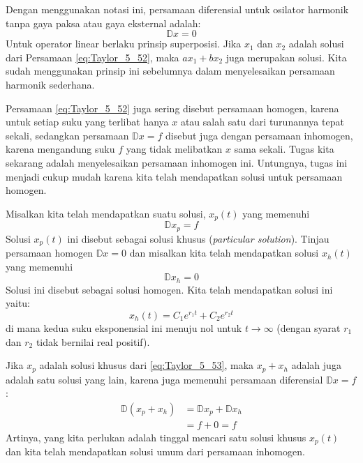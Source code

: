 Dengan menggunakan notasi ini, persamaan diferensial untuk osilator
harmonik tanpa gaya paksa atau gaya eksternal adalah:
\begin{equation}
\mathbb{D}x = 0
\label{eq:Taylor_5_52}
\end{equation}
Untuk operator linear berlaku prinsip superposisi. Jika $x_1$ dan $x_2$ adalah solusi
dari Persamaan \eqref{eq:Taylor_5_52}, maka $ax_1 + bx_2$ juga merupakan solusi. Kita
sudah menggunakan prinsip ini sebelumnya dalam menyelesaikan persamaan harmonik
sederhana.

Persamaan \eqref{eq:Taylor_5_52} juga sering disebut persamaan homogen, karena untuk
setiap suku yang terlibat hanya $x$ atau salah satu dari turunannya
tepat sekali, sedangkan persamaan $\mathbb{D}x = f$ disebut juga dengan
persamaan inhomogen, karena mengandung suku $f$ yang tidak melibatkan
$x$ sama sekali. Tugas kita sekarang adalah menyelesaikan persamaan inhomogen ini.
Untungnya, tugas ini menjadi cukup mudah karena kita telah mendapatkan
solusi untuk persamaan homogen.

Misalkan kita telah mendapatkan suatu solusi, $x_{p}(t)$ yang memenuhi
\begin{equation}
\mathbb{D}x_{p} = f
\label{eq:Taylor_5_53}
\end{equation}
Solusi $x_{p}(t)$ ini disebut sebagai solusi khusus (\textit{particular solution}).
Tinjau persamaan homogen $\mathbb{D}x=0$ dan misalkan kita telah
mendapatkan solusi $x_{h}(t)$ yang memenuhi
\begin{equation*}
\mathbb{D}x_{h}=0
\end{equation*}
Solusi ini disebut sebagai solusi homogen. Kita telah mendapatkan solusi ini
yaitu:
\begin{equation*}
x_{h}(t) = C_{1}e^{r_{1}t} + C_{2}e^{r_{2}t}
\end{equation*}
di mana kedua suku eksponensial ini menuju nol untuk $t\rightarrow\infty$
(dengan syarat $r_{1}$ dan $r_{2}$ tidak bernilai real positif).

Jika $x_{p}$ adalah solusi khusus dari \ref{eq:Taylor_5_53}, maka
$x_{p}+x_{h}$ adalah juga adalah satu solusi yang lain, karena juga
memenuhi persamaan diferensial $\mathbb{D}x=f$:
\begin{align*}
\mathbb{D}(x_{p}+x_{h}) & =\mathbb{D}x_{p}+\mathbb{D}x_{h}\\
 & =f + 0 = f
\end{align*}
Artinya, yang kita perlukan adalah tinggal mencari satu solusi khusus $x_{p}(t)$
dan kita telah mendapatkan solusi umum dari persamaan inhomogen.

